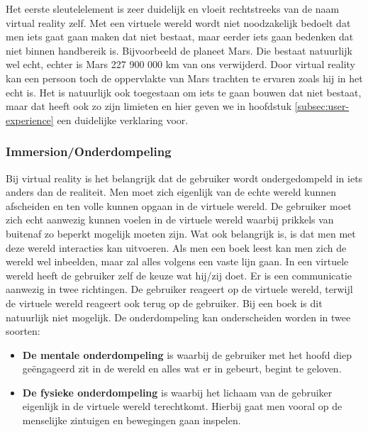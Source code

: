 Het eerste sleutelelement is zeer duidelijk en vloeit rechtstreeks van de naam virtual reality zelf. Met een virtuele wereld wordt niet noodzakelijk bedoelt dat men iets gaat gaan maken dat niet bestaat, maar eerder iets gaan bedenken dat niet binnen handbereik is. Bijvoorbeeld de planeet Mars. Die bestaat natuurlijk wel echt, echter is Mars 227 900 000 km van ons verwijderd. Door virtual reality kan een persoon toch de oppervlakte van Mars trachten te ervaren zoals hij in het echt is. Het is natuurlijk ook toegestaan om iets te gaan bouwen dat niet bestaat, maar dat heeft ook zo zijn limieten en hier geven we in hoofdstuk \ref{subsec:user-experience} een duidelijke verklaring voor.

\subsubsection{Immersion/Onderdompeling}
\label{ssubsec:immersion}
Bij virtual reality is het belangrijk dat de gebruiker wordt ondergedompeld in iets anders dan de realiteit. Men moet zich eigenlijk van de echte wereld kunnen afscheiden en ten volle kunnen opgaan in de virtuele wereld. De gebruiker moet zich echt aanwezig kunnen voelen in de virtuele wereld waarbij prikkels van buitenaf zo beperkt mogelijk moeten zijn. Wat ook belangrijk is, is dat men met deze wereld interacties kan uitvoeren. Als men een boek leest kan men zich de wereld wel inbeelden, maar zal alles volgens een vaste lijn gaan. In een virtuele wereld heeft de gebruiker zelf de keuze wat hij/zij doet. Er is een communicatie aanwezig in twee richtingen. De gebruiker reageert op de virtuele wereld, terwijl de virtuele wereld reageert ook terug op de gebruiker. Bij een boek is dit natuurlijk niet mogelijk. De onderdompeling kan onderscheiden worden in twee soorten:

\begin{itemize}
	\item \textbf{De mentale onderdompeling} is waarbij de gebruiker met het hoofd diep geëngageerd zit in de wereld en alles wat er in gebeurt, begint te geloven.
	\item \textbf{De fysieke onderdompeling} is waarbij het lichaam van de gebruiker eigenlijk in de virtuele wereld terechtkomt. Hierbij gaat men vooral op de menselijke zintuigen en bewegingen gaan inspelen.
\end{itemize}


